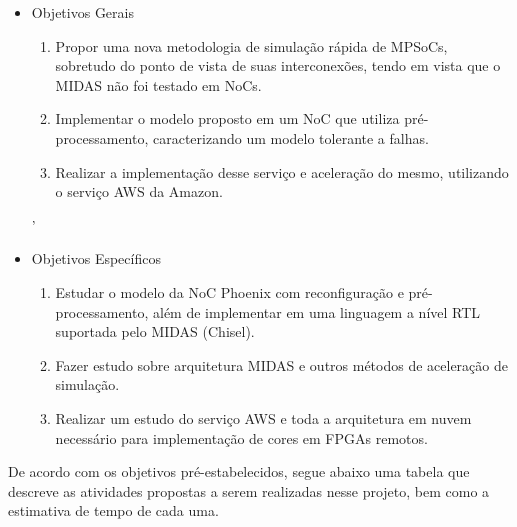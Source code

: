 \documentclass[conference]{IEEEtran}
\begin{document}
	\begin{itemize}
		\item Objetivos Gerais\\
		\begin{enumerate}
			\item Propor uma nova metodologia de simulação rápida de MPSoCs, sobretudo do ponto de vista de suas interconexões, tendo em vista que o MIDAS não foi testado em NoCs.
			\item Implementar o modelo proposto em um NoC que utiliza pré-processamento, caracterizando um modelo tolerante a falhas.
			\item Realizar a implementação desse serviço e aceleração do mesmo, utilizando o serviço AWS da Amazon.
			\\
		\end{enumerate}'
		\item  Objetivos Específicos
		\begin{enumerate}
			\item Estudar o modelo da NoC Phoenix com reconfiguração e pré-processamento, além de implementar em uma linguagem a nível RTL suportada pelo MIDAS (Chisel).
			\item Fazer estudo sobre arquitetura MIDAS e outros métodos de aceleração de simulação.
			\item Realizar um estudo do serviço AWS e toda a arquitetura em nuvem necessário para implementação de cores em FPGAs remotos.
			\\
		\end{enumerate}
	\end{itemize}
	
	De acordo com os objetivos pré-estabelecidos, segue abaixo uma tabela que descreve as atividades propostas a serem realizadas nesse projeto, bem como a estimativa de tempo de cada uma.\\
	
\end{document}
